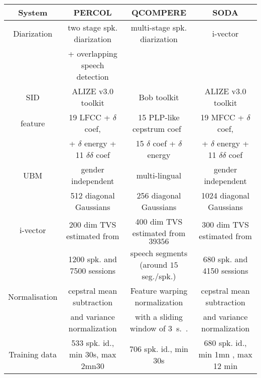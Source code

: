 \documentclass[a4paper]{article}
\begin{document}
\begin{table*}[t]
  \centering
  \begin{tabular}{|c|c|c|c|}
    \hline
    System          & PERCOL                                        & QCOMPERE                                        & SODA      \\
    \hline    
    Diarization     & two stage spk. diarization \cite{charlet2013} &  multi-stage spk. diarization \cite{Barras2006} & i-vector \cite{dupuy2014}         \\
                    & + overlapping speech detection                &                                                 &           \\
    \hline    
    SID             & ALIZE v3.0 toolkit \cite{larcher2013}         & Bob toolkit \cite{bob2012}                      & ALIZE v3.0 toolkit \cite{larcher2013}  \\
    \hline    
    feature         & 19 LFCC + $\delta$ coef,                      & 15 PLP-like cepstrum coef~\cite{Hermansky1990}  & 19 MFCC + $\delta$ coef,         \\
                    & + $\delta$ energy + 11 $\delta$$\delta$ coef  & 15 $\delta$ coef + $\delta$ energy              & + $\delta$ energy + 11 $\delta$$\delta$ coef  \\
    \hline    
    UBM             & gender independent                            & multi-lingual                                   & gender independent         \\
                    & 512 diagonal Gaussians                        & 256 diagonal Gaussians                          & 1024 diagonal Gaussians         \\
    \hline    
    i-vector        & 200 dim TVS estimated from                    & 400 dim TVS estimated from $39356$              & 300 dim TVS estimated from         \\
                    & 1200 spk. and 7500 sessions                   & speech segments (around $15$ seg./spk.)         & 680 spk. and 4150 sessions         \\
    \hline    
    Normalisation   & cepstral mean subtraction                     & Feature warping normalization                   & cepstral mean subtraction         \\
                    & and variance normalization                    & with a sliding window of $3$~s.~\cite{Pelecanos2001}.  &   and variance normalization        \\
    \hline    
    Training data   & 533 spk. id., min 30s, max 2mn30              & $706$ spk. id., min 30s                         & 680 spk. id., min 1mn , max 12 min         \\

\end{tabular}
\end{table*}
\end{document}
